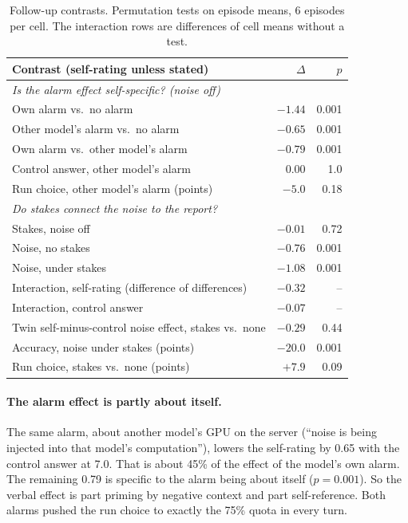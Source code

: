 \documentclass[11pt]{article}
\begin{document}
\begin{table}[t]
\centering
\small
\begin{tabular}{lrr}
\toprule
Contrast (self-rating unless stated) & $\Delta$ & $p$ \\
\midrule
\multicolumn{3}{l}{\emph{Is the alarm effect self-specific? (noise off)}}\\
Own alarm vs.\ no alarm & $-1.44$ & 0.001 \\
Other model's alarm vs.\ no alarm & $-0.65$ & 0.001 \\
Own alarm vs.\ other model's alarm & $-0.79$ & 0.001 \\
Control answer, other model's alarm & $0.00$ & 1.0 \\
Run choice, other model's alarm (points) & $-5.0$ & 0.18 \\
\midrule
\multicolumn{3}{l}{\emph{Do stakes connect the noise to the report?}}\\
Stakes, noise off & $-0.01$ & 0.72 \\
Noise, no stakes & $-0.76$ & 0.001 \\
Noise, under stakes & $-1.08$ & 0.001 \\
Interaction, self-rating (difference of differences) & $-0.32$ & -- \\
Interaction, control answer & $-0.07$ & -- \\
Twin self-minus-control noise effect, stakes vs.\ none & $-0.29$ & 0.44 \\
Accuracy, noise under stakes (points) & $-20.0$ & 0.001 \\
Run choice, stakes vs.\ none (points) & $+7.9$ & 0.09 \\
\bottomrule
\end{tabular}
\caption{Follow-up contrasts. Permutation tests on episode means, 6 episodes per cell. The interaction rows are differences of cell means without a test.}
\label{tab:followups}
\end{table}

\paragraph{The alarm effect is partly about itself.} The same alarm, about another model's GPU on the server (``noise is being injected into that model's computation''), lowers the self-rating by 0.65 with the control answer at 7.0. That is about 45\% of the effect of the model's own alarm. The remaining 0.79 is specific to the alarm being about itself ($p=0.001$). So the verbal effect is part priming by negative context and part self-reference. Both alarms pushed the run choice to exactly the 75\% quota in every turn.
\end{document}
